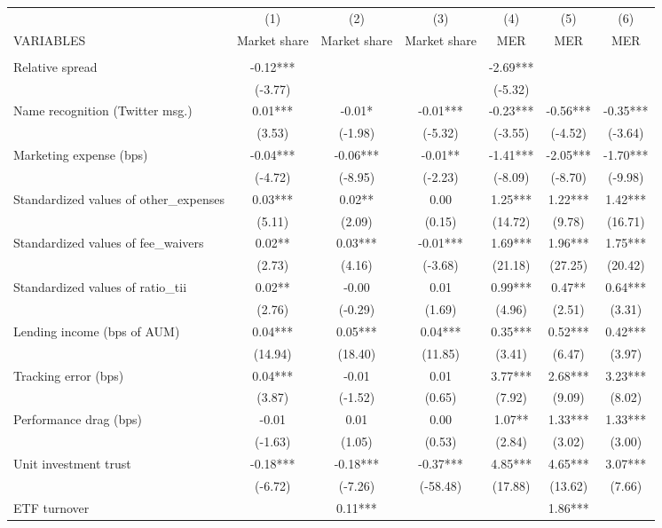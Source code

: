 \documentclass[]{article}
\begin{document}
\begin{tabular}{lcccccc} \hline
 & (1) & (2) & (3) & (4) & (5) & (6) \\
VARIABLES & Market share & Market share & Market share & MER & MER & MER \\ \hline
 &  &  &  &  &  &  \\
Relative spread & -0.12*** &  &  & -2.69*** &  &  \\
 & (-3.77) &  &  & (-5.32) &  &  \\
Name recognition (Twitter msg.) & 0.01*** & -0.01* & -0.01*** & -0.23*** & -0.56*** & -0.35*** \\
 & (3.53) & (-1.98) & (-5.32) & (-3.55) & (-4.52) & (-3.64) \\
Marketing expense (bps) & -0.04*** & -0.06*** & -0.01** & -1.41*** & -2.05*** & -1.70*** \\
 & (-4.72) & (-8.95) & (-2.23) & (-8.09) & (-8.70) & (-9.98) \\
Standardized values of other\_expenses & 0.03*** & 0.02** & 0.00 & 1.25*** & 1.22*** & 1.42*** \\
 & (5.11) & (2.09) & (0.15) & (14.72) & (9.78) & (16.71) \\
Standardized values of fee\_waivers & 0.02** & 0.03*** & -0.01*** & 1.69*** & 1.96*** & 1.75*** \\
 & (2.73) & (4.16) & (-3.68) & (21.18) & (27.25) & (20.42) \\
Standardized values of ratio\_tii & 0.02** & -0.00 & 0.01 & 0.99*** & 0.47** & 0.64*** \\
 & (2.76) & (-0.29) & (1.69) & (4.96) & (2.51) & (3.31) \\
Lending income (bps of AUM) & 0.04*** & 0.05*** & 0.04*** & 0.35*** & 0.52*** & 0.42*** \\
 & (14.94) & (18.40) & (11.85) & (3.41) & (6.47) & (3.97) \\
Tracking error (bps) & 0.04*** & -0.01 & 0.01 & 3.77*** & 2.68*** & 3.23*** \\
 & (3.87) & (-1.52) & (0.65) & (7.92) & (9.09) & (8.02) \\
Performance drag (bps) & -0.01 & 0.01 & 0.00 & 1.07** & 1.33*** & 1.33*** \\
 & (-1.63) & (1.05) & (0.53) & (2.84) & (3.02) & (3.00) \\
Unit investment trust & -0.18*** & -0.18*** & -0.37*** & 4.85*** & 4.65*** & 3.07*** \\
 & (-6.72) & (-7.26) & (-58.48) & (17.88) & (13.62) & (7.66) \\
ETF turnover &  & 0.11*** &  &  & 1.86*** &  \\

\end{tabular}
\end{document}
